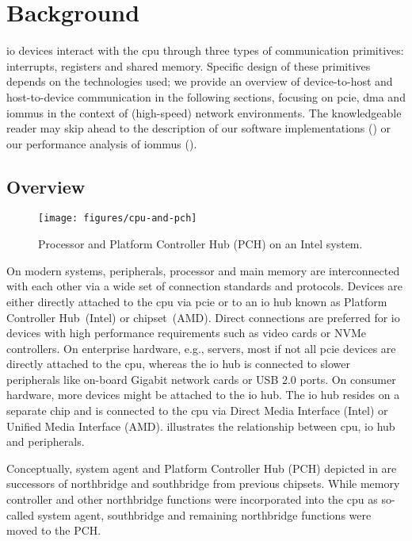 \chapter{Background}
\label{chap:background}

\Ac{io} devices interact with the \ac{cpu} through three types of communication
primitives: interrupts, registers and shared memory. Specific design of these
primitives depends on the technologies used; we provide an overview of
device-to-host and host-to-device communication in the following sections,
focusing on \acs{pcie}, \acs{dma} and \acsp{iommu} in the context of
(high-speed) network environments. The knowledgeable reader may skip ahead to
the description of our software implementations () or
our performance analysis of \acp{iommu} ().


\section{Overview}
\label{sec:overview}

\begin{figure}[!b]
    \centering
    \texttt{[image: figures/cpu-and-pch]}
    \caption{Processor and Platform Controller Hub (PCH) on an Intel system.}
    \label{fig:pch}
\end{figure}

On modern systems, peripherals, processor and main memory are interconnected
with each other via a wide set of connection standards and protocols. Devices
are either directly attached to the \ac{cpu} via \ac{pcie} or to an \acs{io} hub
known as Platform Controller Hub~(Intel) or chipset~(AMD). Direct connections
are preferred for \ac{io} devices with high performance requirements such as
video cards or NVMe controllers. On enterprise hardware, e.g., servers, most if
not all \ac{pcie} devices are directly attached to the \ac{cpu}, whereas the
\ac{io} hub is connected to slower peripherals like on-board Gigabit network
cards or USB 2.0 ports. On consumer hardware, more devices might be attached to
the \ac{io} hub. The \ac{io} hub resides on a separate chip and is connected to
the \ac{cpu} via Direct Media Interface (Intel) or Unified Media Interface
(AMD).  illustrates the relationship between \ac{cpu}, \ac{io} hub
and peripherals.

Conceptually, system agent and Platform Controller Hub (PCH) depicted in
 are successors of northbridge and southbridge from previous
chipsets. While memory controller and other northbridge functions were
incorporated into the \ac{cpu} as so-called system agent, southbridge and
remaining northbridge functions were moved to the PCH.


